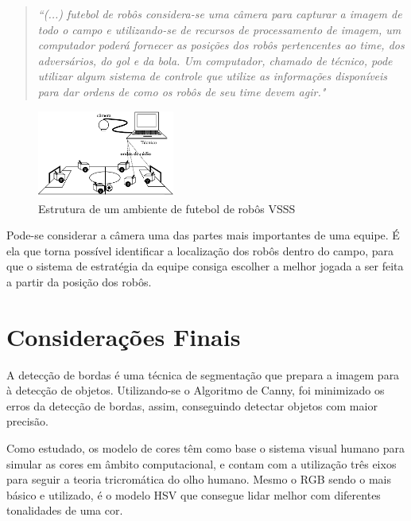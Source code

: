 \begin{quotation}
\textit{
``(...) futebol de robôs considera-se uma câmera para capturar
a imagem de todo o campo e utilizando-se de recursos de processamento de imagem, um
computador poderá fornecer as posições dos robôs pertencentes ao time, dos adversários,
do gol e da bola. Um computador, chamado de técnico, pode utilizar algum sistema de
controle que utilize as informações disponíveis para dar ordens de como os robôs de seu
time devem agir."}\cite{Faria2006}
\end{quotation}
 \begin{figure}[H]
	\centering
	\includegraphics[width=0.4\textwidth]{futbots.pdf}
	\caption{Estrutura de um ambiente de futebol de robôs VSSS\cite{Faria2006}}
	\label{fig:VSSS}
\end{figure} 

Pode-se considerar a câmera uma das partes mais importantes de uma equipe. É ela que torna possível identificar a localização dos robôs dentro do campo, para que o sistema de estratégia da equipe consiga escolher a melhor jogada a ser feita a partir da posição dos robôs. 
\section{Considerações Finais}
A detecção de bordas é uma técnica de segmentação que prepara a imagem para à detecção de objetos. Utilizando-se o Algoritmo de Canny, foi minimizado os erros da detecção de bordas, assim, conseguindo detectar objetos com maior precisão. 

Como estudado, os modelo de cores têm como base o sistema visual humano para simular as cores em âmbito computacional, e contam com a utilização três eixos para seguir a teoria tricromática do olho humano. Mesmo o RGB sendo o mais básico e utilizado, é o modelo HSV  que consegue lidar melhor com diferentes tonalidades de uma cor.
